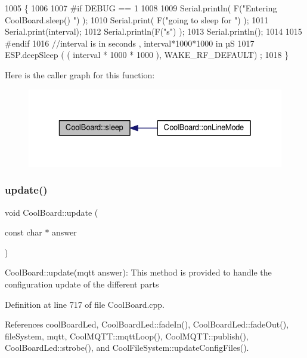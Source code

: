 \begin{DoxyCode}
1005 \{
1006 
1007 \textcolor{preprocessor}{#if DEBUG == 1}
1008 
1009     Serial.println( F(\textcolor{stringliteral}{"Entering CoolBoard.sleep() "}) );
1010     Serial.print( F(\textcolor{stringliteral}{"going to sleep for "}) );
1011     Serial.print(interval);
1012     Serial.println(F(\textcolor{stringliteral}{"s"}) );
1013     Serial.println();
1014 
1015 \textcolor{preprocessor}{#endif}
1016     \textcolor{comment}{//interval is in seconds , interval*1000*1000 in µS}
1017     ESP.deepSleep ( ( interval * 1000 * 1000 ), WAKE\_RF\_DEFAULT) ;
1018 \}
\end{DoxyCode}
Here is the caller graph for this function\+:\nopagebreak
\begin{figure}[H]
\begin{center}
\leavevmode
\includegraphics[width=329pt]{classCoolBoard_a069952cdcb2e7f68518aa429eceadb6e_icgraph}
\end{center}
\end{figure}
\mbox{\label{classCoolBoard_a8612756d3f73198cdde857a66f0fe690}} 
\subsubsection{\texorpdfstring{update()}{update()}}
{\footnotesize\ttfamily void Cool\+Board\+::update (\begin{DoxyParamCaption}\item[{const char $\ast$}]{answer }\end{DoxyParamCaption})}

Cool\+Board\+::update(mqtt answer)\+: This method is provided to handle the configuration update of the different parts 

Definition at line 717 of file Cool\+Board.\+cpp.



References cool\+Board\+Led, Cool\+Board\+Led\+::fade\+In(), Cool\+Board\+Led\+::fade\+Out(), file\+System, mqtt, Cool\+M\+Q\+T\+T\+::mqtt\+Loop(), Cool\+M\+Q\+T\+T\+::publish(), Cool\+Board\+Led\+::strobe(), and Cool\+File\+System\+::update\+Config\+Files().



